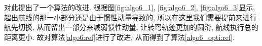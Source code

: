     对此提出了一个算法的改进. 根据图\ref{fig:algo6_1}, \ref{fig:algo6_2}, \ref{fig:algo6_3}显示, 超出航线的那一小部分还是由于惯性动量导致的, 所以在这里我们需要提前来进行航先切换, 从而留出一部分来减弱惯性动量, 让转弯轨迹更加的圆滑, 航线执行总的距离更小. 故对算法\ref{algo6:ref}进行了改进, 从而得到了算法\ref{algo6_opti:ref}.   
    \begin{figure}[htbp]
        \centering
        \\
\end{figure}
